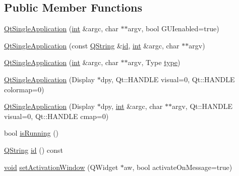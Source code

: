 \subsection*{Public Member Functions}
\begin{DoxyCompactItemize}
\item 
\hyperlink{class_shared_tools_1_1_qt_single_application_a30a41b1b5c6e9c3fdbe7befe38b31a72}{Qt\-Single\-Application} (\hyperlink{ioapi_8h_a787fa3cf048117ba7123753c1e74fcd6}{int} \&argc, char $\ast$$\ast$argv, bool G\-U\-Ienabled=true)
\item 
\hyperlink{class_shared_tools_1_1_qt_single_application_a4d797ae0a19df72d7d90ec01701d9463}{Qt\-Single\-Application} (const \hyperlink{group___u_a_v_objects_plugin_gab9d252f49c333c94a72f97ce3105a32d}{Q\-String} \&\hyperlink{glext_8h_a58c2a664503e14ffb8f21012aabff3e9}{id}, \hyperlink{ioapi_8h_a787fa3cf048117ba7123753c1e74fcd6}{int} \&argc, char $\ast$$\ast$argv)
\item 
\hyperlink{class_shared_tools_1_1_qt_single_application_a321aaf6526a914f5058958fdd883d24a}{Qt\-Single\-Application} (\hyperlink{ioapi_8h_a787fa3cf048117ba7123753c1e74fcd6}{int} \&argc, char $\ast$$\ast$argv, Type \hyperlink{glext_8h_a7d05960f4f1c1b11f3177dc963a45d86}{type})
\item 
\hyperlink{class_shared_tools_1_1_qt_single_application_a79f0658508b8256a3535f9e4a5bf70a7}{Qt\-Single\-Application} (Display $\ast$dpy, Qt\-::\-H\-A\-N\-D\-L\-E visual=0, Qt\-::\-H\-A\-N\-D\-L\-E colormap=0)
\item 
\hyperlink{class_shared_tools_1_1_qt_single_application_a5a580d0531b09c253fd26a6e7055006f}{Qt\-Single\-Application} (Display $\ast$dpy, \hyperlink{ioapi_8h_a787fa3cf048117ba7123753c1e74fcd6}{int} \&argc, char $\ast$$\ast$argv, Qt\-::\-H\-A\-N\-D\-L\-E visual=0, Qt\-::\-H\-A\-N\-D\-L\-E cmap=0)
\item 
bool \hyperlink{class_shared_tools_1_1_qt_single_application_a5ca39417f78bc18e1ca6c90f3893f564}{is\-Running} ()
\item 
\hyperlink{group___u_a_v_objects_plugin_gab9d252f49c333c94a72f97ce3105a32d}{Q\-String} \hyperlink{class_shared_tools_1_1_qt_single_application_af93c0790cd8d680b990a3f162ad638f7}{id} () const 
\item 
\hyperlink{group___u_a_v_objects_plugin_ga444cf2ff3f0ecbe028adce838d373f5c}{void} \hyperlink{class_shared_tools_1_1_qt_single_application_add1b1cfa4c420fe918f0ed0f6612307e}{set\-Activation\-Window} (Q\-Widget $\ast$aw, bool activate\-On\-Message=true)
\item 

\end{DoxyCompactItemize}
